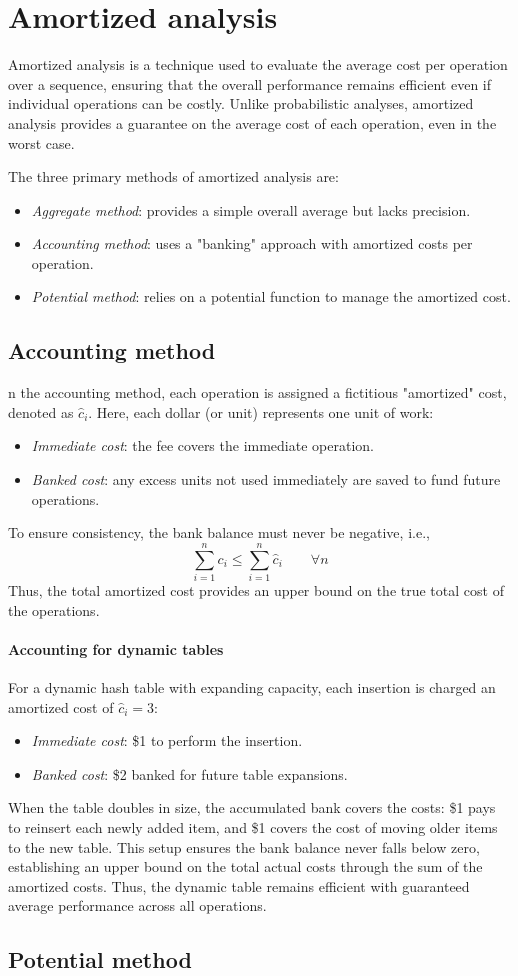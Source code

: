 \section{Amortized analysis}

Amortized analysis is a technique used to evaluate the average cost per operation over a sequence, ensuring that the overall performance remains efficient even if individual operations can be costly. 
Unlike probabilistic analyses, amortized analysis provides a guarantee on the average cost of each operation, even in the worst case.

The three primary methods of amortized analysis are:
\begin{itemize}
    \item \textit{Aggregate method}: provides a simple overall average but lacks precision.
    \item \textit{Accounting method}: uses a "banking" approach with amortized costs per operation.
    \item \textit{Potential method}: relies on a potential function to manage the amortized cost.
\end{itemize}

\subsection{Accounting method}
n the accounting method, each operation is assigned a fictitious "amortized" cost, denoted as $\hat{c}_i$. Here, each dollar (or unit) represents one unit of work:
\begin{itemize}
    \item \textit{Immediate cost}: the fee covers the immediate operation.
    \item \textit{Banked cost}: any excess units not used immediately are saved to fund future operations.
\end{itemize}
To ensure consistency, the bank balance must never be negative, i.e.,
\[\sum_{i=1}^nc_i\leq\sum_{i=1}^n\hat{c}_i \qquad\forall n\]
Thus, the total amortized cost provides an upper bound on the true total cost of the operations.

\paragraph*{Accounting for dynamic tables}
For a dynamic hash table with expanding capacity, each insertion is charged an amortized cost of $\hat{c}_i=3$:
\begin{itemize}
    \item \textit{Immediate cost}: \$1 to perform the insertion.
    \item \textit{Banked cost}: \$2 banked for future table expansions.
\end{itemize}
When the table doubles in size, the accumulated bank covers the costs: \$1 pays to reinsert each newly added item, and \$1 covers the cost of moving older items to the new table.
This setup ensures the bank balance never falls below zero, establishing an upper bound on the total actual costs through the sum of the amortized costs. 
Thus, the dynamic table remains efficient with guaranteed average performance across all operations.

\subsection{Potential method}




